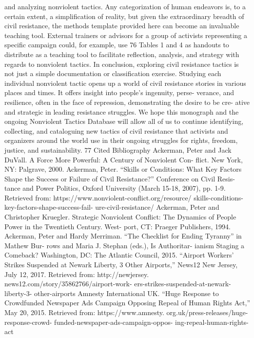 \documentclass[twoside,a4paper,12pt,fleqn,openany]{extbook}
\begin{document}
and analyzing nonviolent tactics. Any categorization of human endeavors is, to a certain
extent, a simplification of reality, but given the extraordinary breadth of civil resistance, the
methods template provided here can become an invaluable teaching tool. External trainers
or advisors for a group of activists representing a specific campaign could, for example, use
76
Tables 1 and 4 as handouts to distribute as a teaching tool to facilitate reflection, analysis,
and strategy with regards to nonviolent tactics.
In conclusion, exploring civil resistance tactics is not just a simple documentation or
classification exercise. Studying each individual nonviolent tactic opens up a world of civil
resistance stories in various places and times. It offers insight into people’s ingenuity, perse-
verance, and resilience, often in the face of repression, demonstrating the desire to be cre-
ative and strategic in leading resistance struggles.
We hope this monograph and the ongoing Nonviolent Tactics Database will allow all of
us to continue identifying, collecting, and cataloguing new tactics of civil resistance that
activists and organizers around the world use in their ongoing struggles for rights, freedom,
justice, and sustainability.
77
Cited Bibliography
Ackerman, Peter and Jack DuVall. A Force
More Powerful: A Century of Nonviolent Con-
flict. New York, NY: Palgrave, 2000.
Ackerman, Peter. “Skills or Conditions: What
Key Factors Shape the Success or Failure of
Civil Resistance?” Conference on Civil Resis-
tance and Power Politics, Oxford University
(March 15-18, 2007), pp. 1-9. Retrieved from:
https://www.nonviolent-conflict.org/resource/
skills-conditions-key-factors-shape-success-fail-
ure-civil-resistance/
Ackerman, Peter and Christopher Kruegler.
Strategic Nonviolent Conflict: The Dynamics of
People Power in the Twentieth Century. West-
port, CT: Praeger Publishers, 1994.
Ackerman, Peter and Hardy Merriman. “The
Checklist for Ending Tyranny” in Mathew Bur-
rows and Maria J. Stephan (eds.), Is Authoritar-
ianism Staging a Comeback? Washington, DC:
The Atlantic Council, 2015.
“Airport Workers’ Strikes Suspended at Newark
Liberty, 3 Other Airports,” News12 New Jersey,
July 12, 2017. Retrieved from: http://newjersey.
news12.com/story/35862766/airport-work-
ers-strikes-suspended-at-newark-liberty-3-
other-airports
Amnesty International UK. “Huge Response to
Crowdfunded Newspaper Ads Campaign
Opposing Repeal of Human Rights Act,” May
20, 2015. Retrieved from: https://www.amnesty.
org.uk/press-releases/huge-response-crowd-
funded-newspaper-ads-campaign-oppos-
ing-repeal-human-rights-act
\end{document}
